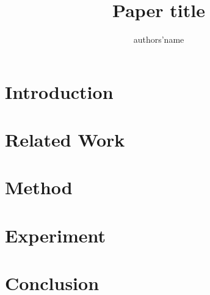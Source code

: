 \documentclass{article} %
\begin{document}
\title{Paper title}
\author{authors'name}
\maketitle

\begin{abstract}
    
\end{abstract}

\section{Introduction} 


\section{Related Work}


\section{Method}


\section{Experiment}


\section{Conclusion}




\end{document}

